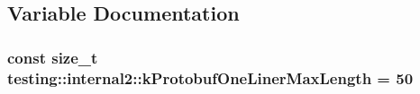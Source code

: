 \subsection{Variable Documentation}
\subsubsection[{\texorpdfstring{k\+Protobuf\+One\+Liner\+Max\+Length}{kProtobufOneLinerMaxLength}}]{\setlength{\rightskip}{0pt plus 5cm}const size\+\_\+t testing\+::internal2\+::k\+Protobuf\+One\+Liner\+Max\+Length = 50}\hypertarget{namespacetesting_1_1internal2_a140c8efd51e63a3def98445bff107518}{}\label{namespacetesting_1_1internal2_a140c8efd51e63a3def98445bff107518}
